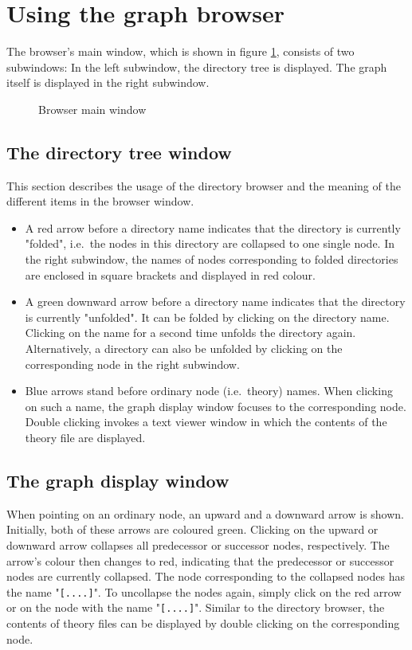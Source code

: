 \section{Using the graph browser}
The browser's main window, which is shown in figure \ref{browserwindow},
consists of two subwindows: In the left subwindow, the directory tree
is displayed. The graph itself is displayed in the right subwindow.
\begin{figure}[h]
\setlength{\epsfxsize}{\textwidth}
\caption{\label{browserwindow} Browser main window}
\end{figure}

\subsection*{The directory tree window}
This section describes the usage of the directory browser and the
meaning of the different items in the browser window.
\begin{itemize}
\item A red arrow before a directory name indicates that the directory is
currently "folded", i.e.~the nodes in this directory
are collapsed to one single node. In the right subwindow, the names of
nodes corresponding to folded directories are enclosed in square brackets
and displayed in red colour.
\item A green downward arrow before a directory name indicates that the
directory is currently "unfolded". It can be folded by clicking on the
directory name.
Clicking on the name for a second time unfolds the directory again.
Alternatively, a directory can also be unfolded by clicking on the
corresponding node in the right subwindow.
\item Blue arrows stand before ordinary node (i.e.~theory) names. When
clicking on such a name, the graph display window focuses to the
corresponding node. Double clicking invokes a text viewer window in
which the contents of the theory file are displayed.
\end{itemize}

\subsection*{The graph display window}
When pointing on an ordinary node, an upward and a downward arrow is shown.
Initially, both of these arrows are coloured green. Clicking on the
upward or downward arrow collapses all predecessor or successor nodes,
respectively. The arrow's colour then changes to red, indicating that
the predecessor or successor nodes are currently collapsed. The node
corresponding to the collapsed nodes has the name "{\tt [....]}". To
uncollapse the nodes again, simply click on the red arrow or on the node
with the name "{\tt [....]}". Similar to the directory browser, the contents
of theory files can be displayed by double clicking on the corresponding
node. 

